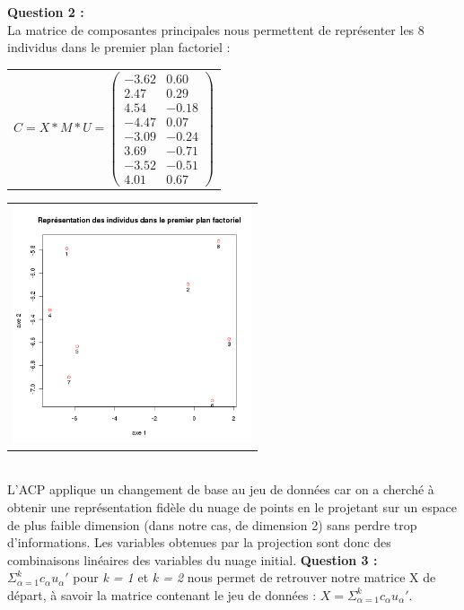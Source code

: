 \documentclass[a4paper, 10pt]{article}
\begin{document}
\textbf{Question 2 :}\\
La matrice de composantes principales nous permettent de représenter les 8 individus dans le premier plan factoriel :\\
\hspace*{0.5cm}
\begin{tabular}{c}
$C = X * M * U =
\begin{pmatrix}
-3.62 & 0.60 \\
2.47 & 0.29 \\
4.54 & -0.18 \\
-4.47 & 0.07 \\
-3.09 & -0.24 \\
3.69 & -0.71 \\
-3.52 & -0.51 \\
4.01 & 0.67
\end{pmatrix}$\\
\end{tabular}
\hspace*{1cm}
\begin{tabular}{c}
\includegraphics[height = 7cm, width = 7cm]{plots/biplot_exo1_princomp.png}\\
\end{tabular}\\
L'ACP applique un changement de base au jeu de données car on a cherché à obtenir une représentation fidèle du nuage de points en
le projetant sur un espace de plus faible dimension (dans notre cas, de dimension 2) sans perdre trop d'informations.
Les variables obtenues par la projection sont donc des combinaisons linéaires des variables du nuage initial.
\newpage
\noindent
\textbf{Question 3 :}\\
$\varSigma^{k}_{\alpha=1} c_{\alpha}u_{\alpha}'$ pour \textit{k = 1} et \textit{k = 2} nous permet de retrouver notre matrice X de départ,
à savoir la matrice contenant le jeu de données : $X = \varSigma^{k}_{\alpha=1} c_{\alpha}u_{\alpha}'$.
\end{document}
